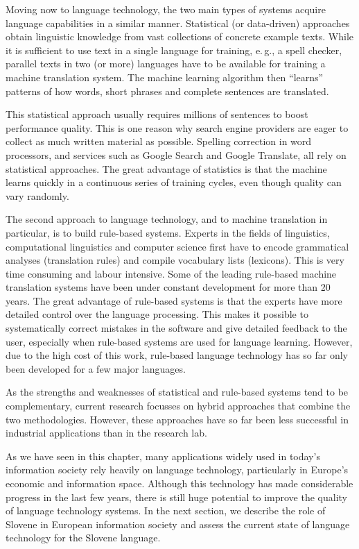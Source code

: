 \begin{multicols}{2}
Moving now to language technology, the two main types of systems acquire language capabilities in a similar manner. Statistical (or data-driven) approaches obtain linguistic knowledge from vast collections of concrete example texts. While it is sufficient to use text in a single language for training, e.\,g., a spell checker, parallel texts in two (or more) languages have to be available for training a machine translation system. The machine learning algorithm then “learns” patterns of how words, short phrases and complete sentences are translated. 

This statistical approach usually requires millions of sentences to boost performance quality. This is one reason why search engine providers are eager to collect as much written material as possible. Spelling correction in word processors, and services such as Google Search and Google Translate, all rely on statistical approaches. The great advantage of statistics is that the machine learns quickly in a continuous series of training cycles, even though quality can vary randomly.

The second approach to language technology, and to machine translation in particular, is to build rule-based systems. Experts in the fields of linguistics, computational linguistics and computer science first have to encode grammatical analyses (translation rules) and compile vocabulary lists (lexicons). This is very time consuming and labour intensive. Some of the leading rule-based machine translation systems have been under constant development for more than 20 years. The great advantage of rule-based systems is that the experts have more detailed control over the language processing. This makes it possible to systematically correct mistakes in the software and give detailed feedback to the user, especially when rule-based systems are used for language learning. However, due to the high cost of this work, rule-based language technology has so far only been developed for a few major languages. 


As the strengths and weaknesses of statistical and rule-based systems tend to be complementary, current research focusses on hybrid approaches that combine the two methodologies. However, these approaches have so far been less successful in industrial applications than in the research lab. 

As we have seen in this chapter, many applications widely used in today’s information society rely heavily on language technology, particularly in Europe’s economic and information space. Although this technology has made considerable progress in the last few years, there is still huge potential to improve the quality of language technology systems. In the next section, we describe the role of Slovene in European information society and assess the current state of language technology for the Slovene language.
\end{multicols}

